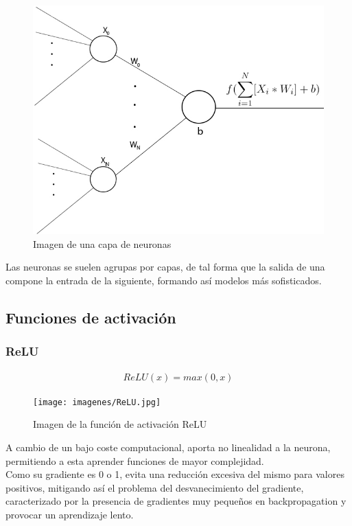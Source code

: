 \begin{figure}[H]
	\centering
	\includegraphics[scale=0.35]{imagenes/capa_neuronas.jpg}  
	\caption{Imagen de una capa de neuronas}
	\label{fig:capa_neuronas}
\end{figure}

Las neuronas se suelen agrupas por capas, de tal forma que la salida de una compone la entrada de la siguiente, formando así modelos más sofisticados.

\subsection{Funciones de activación}

\subsubsection{ReLU}

\begin{gather}
	ReLU(x) = max(0, x)
\end{gather}

\begin{figure}[H]
	\centering
	\texttt{[image: imagenes/ReLU.jpg]}  
	\caption{Imagen de la función de activación ReLU}
	\label{fig:ReLU}
\end{figure}

A cambio de un bajo coste computacional, aporta no linealidad a la neurona, permitiendo a esta aprender funciones de mayor complejidad. \\
Como su gradiente es 0 o 1, evita una reducción excesiva del mismo para valores positivos, mitigando así el problema del desvanecimiento del gradiente, caracterizado por la presencia de gradientes muy pequeños en backpropagation y provocar un aprendizaje lento. \cite{ReLU}

